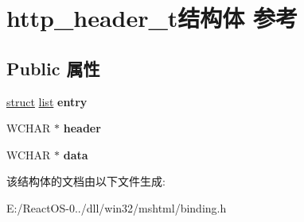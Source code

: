 \hypertarget{structhttp__header__t}{}\section{http\+\_\+header\+\_\+t结构体 参考}
\label{structhttp__header__t}
\subsection*{Public 属性}
\begin{DoxyCompactItemize}
\item 
\mbox{\label{structhttp__header__t_a4350be98167a13a30e2e77c70c66f29a}} 
\hyperlink{interfacestruct}{struct} \hyperlink{classlist}{list} {\bfseries entry}
\item 
\mbox{\label{structhttp__header__t_ab15ffbf30d12d3be517e2e3d49412557}} 
W\+C\+H\+AR $\ast$ {\bfseries header}
\item 
\mbox{\label{structhttp__header__t_a71c3c04ffd418d2846059bbecd703e82}} 
W\+C\+H\+AR $\ast$ {\bfseries data}
\end{DoxyCompactItemize}


该结构体的文档由以下文件生成\+:\begin{DoxyCompactItemize}
\item 
E\+:/\+React\+O\+S-\/0../dll/win32/mshtml/binding.\+h\end{DoxyCompactItemize}
